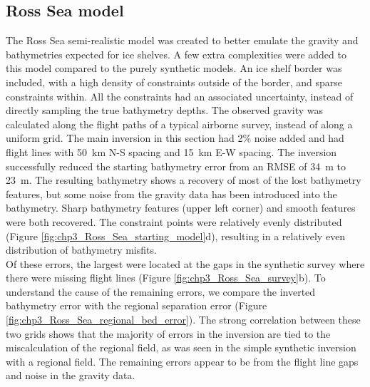 \subsection{Ross Sea model}

The Ross Sea semi-realistic model was created to better emulate the gravity and bathymetries expected for ice shelves. A few extra complexities were added to this model compared to the purely synthetic models. An ice shelf border was included, with a high density of constraints outside of the border, and sparse constraints within. All the constraints had an associated uncertainty, instead of directly sampling the true bathymetry depths. The observed gravity was calculated along the flight paths of a typical airborne survey, instead of along a uniform grid. The main inversion in this section had 2\% noise added and had flight lines with 50~km N-S spacing and 15~km E-W spacing. The inversion successfully reduced the starting bathymetry error from an RMSE of 34~m to 23~m. The resulting bathymetry shows a recovery of most of the lost bathymetry features, but some noise from the gravity data has been introduced into the bathymetry. Sharp bathymetry features (upper left corner) and smooth features were both recovered. The constraint points were relatively evenly distributed (Figure \ref{fig:chp3_Ross_Sea_starting_model}d), resulting in a relatively even distribution of bathymetry misfits. \\

Of these errors, the largest were located at the gaps in the synthetic survey where there were missing flight lines (Figure \ref{fig:chp3_Ross_Sea_survey}b). To understand the cause of the remaining errors, we compare the inverted bathymetry error with the regional separation error (Figure \ref{fig:chp3_Ross_Sea_regional_bed_error}). The strong correlation between these two grids shows that the majority of errors in the inversion are tied to the miscalculation of the regional field, as was seen in the simple synthetic inversion with a regional field. The remaining errors appear to be from the flight line gaps and noise in the gravity data. 

